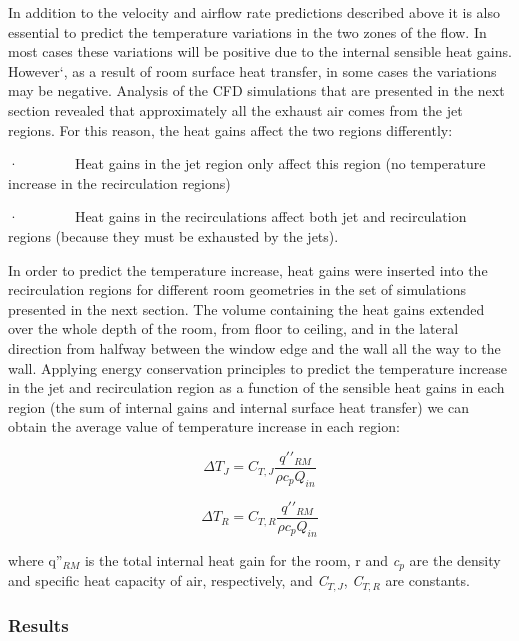 In addition to the velocity and airflow rate predictions described above it is also essential to predict the temperature variations in the two zones of the flow. In most cases these variations will be positive due to the internal sensible heat gains. However`, as a result of room surface heat transfer, in some cases the variations may be negative. Analysis of the CFD simulations that are presented in the next section revealed that approximately all the exhaust air comes from the jet regions. For this reason, the heat gains affect the two regions differently:

·~~~~~~~~Heat gains in the jet region only affect this region (no temperature increase in the recirculation regions)

·~~~~~~~~Heat gains in the recirculations affect both jet and recirculation regions (because they must be exhausted by the jets).

In order to predict the temperature increase, heat gains were inserted into the recirculation regions for different room geometries in the set of simulations presented in the next section. The volume containing the heat gains extended over the whole depth of the room, from floor to ceiling, and in the lateral direction from halfway between the window edge and the wall all the way to the wall. Applying energy conservation principles to predict the temperature increase in the jet and recirculation region as a function of the sensible heat gains in each region (the sum of internal gains and internal surface heat transfer) we can obtain the average value of temperature increase in each region:

\begin{equation}
\Delta {T_J} = {C_{T,J}}\frac{{q'{'_{RM}}}}{{\rho {c_p}{Q_{in}}}}
\end{equation}

\begin{equation}
\Delta {T_R} = {C_{T,R}}\frac{{q'{'_{RM}}}}{{\rho {c_p}{Q_{in}}}}
\end{equation}

where q''\(_{RM}\) is the total internal heat gain for the room, r and \emph{c}\(_{p}\) are the density and specific heat capacity of air, respectively, and \emph{C}\(_{T,J}\), \emph{C}\(_{T,R}\) are constants.

\subsubsection{Results}\label{results}

